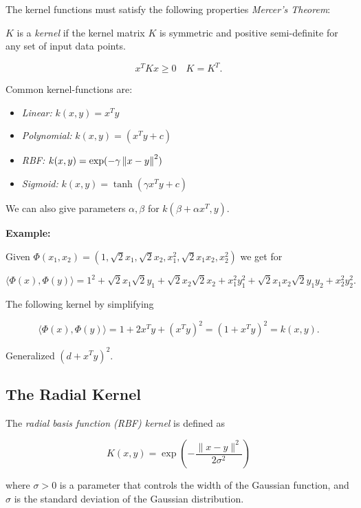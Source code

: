 The kernel functions must satisfy the following properties \emph{Mercer's Theorem}:

\(K\) is a \emph{kernel} if the kernel matrix \(K\) is symmetric and positive semi-definite for any set of input data points.

\[
	x^T K x \ge 0 \quad K = K^T.
\]

Common kernel-functions are:

\begin{itemize}

	\item \emph{Linear:} \(k(x,y) = x^T y\)

	\item \emph{Polynomial:} \(k(x,y) = (x^T y + c)\)

	\item \emph{RBF:} \(k(x,y) = \exp( -\gamma \left\| x -  y \right\|^2)\)

	\item \emph{Sigmoid:} \(k(x,y) = \tanh( \gamma x^Ty + c)\)

\end{itemize}

We can also give parameters \(\alpha, \beta\) for \(k(\beta + \alpha x^T, y)\).

\textbf{Example:}

Given \(\Phi(x_1, x_2) = (1, \sqrt{2}x_1, \sqrt{2}x_2, x_1^2, \sqrt{2}x_1x_2, x_2^2)\) we
get for

\[
	\langle \Phi(x), \Phi(y)\rangle = 1^2 +  \sqrt{2}x_1\sqrt{2}y_1 + \sqrt{2}x_2\sqrt{2}x_2 + x_1^2 y_1^2 + \sqrt{2}x_1x_2 \sqrt{2}y_1y_2 + x_2^2 y_2^2.
\]

The following kernel by simplifying

\[
	\langle \Phi(x), \Phi(y)\rangle = 1 + 2x^T y + (x^Ty)^2 = (1 + x^Ty)^2 = k(x,y).
\]

Generalized \((d + x^Ty)^2 \).

\subsection{The Radial Kernel}

The \emph{radial basis function (RBF) kernel} is defined as

\[
	K(x, y) = \exp\left(- \frac{\|x - y\|^2}{2\sigma^2}\right)
\]

where \(\sigma > 0\) is a parameter that controls the width of the Gaussian function, and
\(\sigma\) is the standard deviation of the Gaussian distribution.

